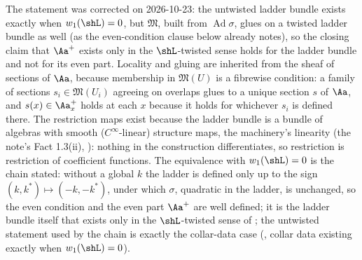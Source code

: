The statement was corrected on 2026-10-23: the untwisted ladder bundle exists exactly when $w_1(\shL) = 0$, but $\mathfrak{M}$, built from $\operatorname{Ad}\sigma$, glues on a twisted ladder bundle as well (as the even-condition clause below already notes), so the closing claim that $\Aa^{+}$ exists only in the $\shL$-twisted sense holds for the ladder bundle and not for its even part. Locality and gluing are inherited from the sheaf of sections of $\Aa$, because membership in $\mathfrak{M}(U)$ is a fibrewise condition: a family of sections $s_i \in \mathfrak{M}(U_i)$ agreeing on overlaps glues to a unique section $s$ of $\Aa$, and $s(x) \in \Aa_x^{+}$ holds at each $x$ because it holds for whichever $s_i$ is defined there. The restriction maps exist because the ladder bundle is a bundle of algebras with smooth ($C^\infty$-linear) structure maps, the machinery's linearity (the note's Fact 1.3(ii), ): nothing in the construction differentiates, so restriction is restriction of coefficient functions. The equivalence with $w_1(\shL) = 0$ is the chain stated: without a global $k$ the ladder is defined only up to the sign $(k, k^{*}) \mapsto (-k, -k^{*})$, under which $\sigma$, quadratic in the ladder, is unchanged, so the even condition and the even part $\Aa^{+}$ are well defined; it is the ladder bundle itself that exists only in the $\shL$-twisted sense of \cite[\S 4]{ButlerT4}; the untwisted statement used by the chain is exactly the collar-data case (, collar data existing exactly when $w_1(\shL) = 0$).
